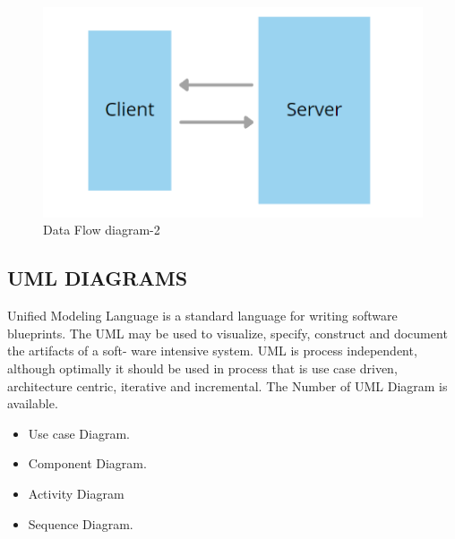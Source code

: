 \documentclass[12pt]{report}
\begin{document}
\vspace{1.5cm}
\begin{figure}[h]
\centering
\includegraphics[scale=1.0]{ Data Flow diagram-1.png}
\caption{ Data Flow diagram-2}
\label{ Data Flow diagram-2}
\end{figure}


\clearpage
\justifying
\setlength{\parindent}{4em}
\setlength{\parskip}{0.5em}
\renewcommand{\baselinestretch}{1.5}
\normalsize
\subsection{UML DIAGRAMS}
Unified Modeling Language is a standard language for writing software blueprints. The
UML may be used to visualize, specify, construct and document the artifacts of a soft- ware
intensive system. UML is process independent, although optimally it should be used in
process that is use case driven, architecture centric, iterative and incremental. The Number
of UML Diagram is available.


\begin{itemize}
\item Use case Diagram.

\item Component Diagram.

\item Activity Diagram

\item  Sequence Diagram.

\end{itemize}

\clearpage
\end{document}
